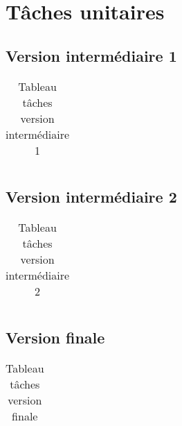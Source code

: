 \section{Tâches unitaires}
	\label{sec:taches_unitaires}

	\subsection{Version intermédiaire 1}

		\begin{table}
			\centering
			\begin{tabular}{|l|l|l|}

			\end{tabular}
			\caption{Tableau tâches version intermédiaire 1}
			\label{fig:taches_units_1}
		\end{table}

	\subsection{Version intermédiaire 2}

		\begin{table}
			\centering
			\begin{tabular}{|l|l|l|}

			\end{tabular}
			\caption{Tableau tâches version intermédiaire 2}
			\label{fig:taches_units_2}
		\end{table}

	\subsection{Version finale}

		\begin{table}
			\centering
			\begin{tabular}{|l|l|l|}

			\end{tabular}
			\caption{Tableau tâches version finale}
			\label{fig:taches_units_3}
		\end{table}